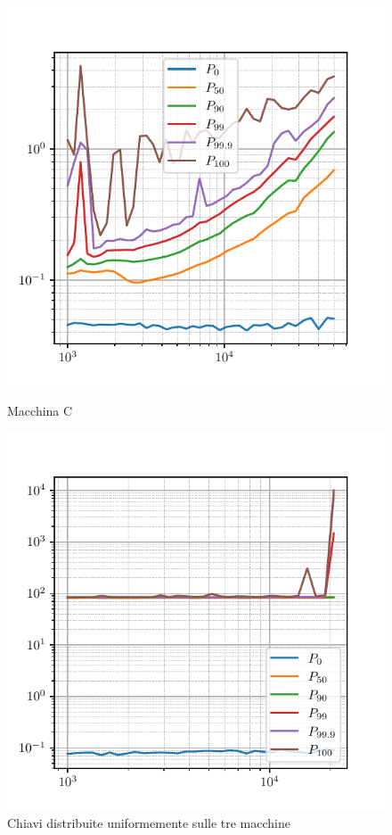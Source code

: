\begin{figure}[htbp]
    \vspace{0.5cm}
    \begin{minipage}[t]{0.48\textwidth}
        \centering
        \includegraphics[width=\textwidth]{03-risultati/freq-latency/bench-get-h}
        \caption*{Macchina C}
    \end{minipage}
    \hfill
    \begin{minipage}[t]{0.48\textwidth}
        \centering
        \includegraphics[width=\textwidth]{03-risultati/freq-latency/bench-get-all}
        \caption*{Chiavi distribuite uniformemente sulle tre macchine}
    \end{minipage}


\end{figure}
